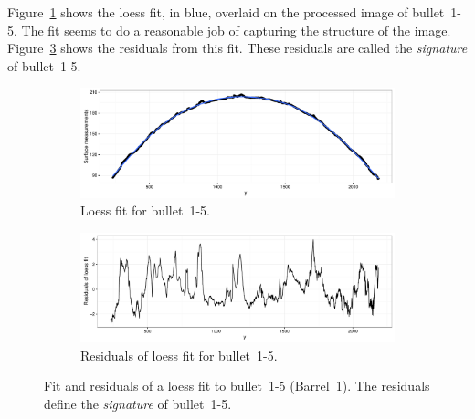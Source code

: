 \documentclass[aoas, preprint]{imsart}\usepackage[]{graphicx}\usepackage[]{color}
\newenvironment{knitrout}{}{} %
\newcommand{\hh}[1]{{\color{magenta} #1}}
\begin{document}

Figure~\ref{fig:loess_fit} shows the loess fit, in blue, overlaid on the processed image of bullet~1-5. The fit seems to do a reasonable job of capturing the structure of the image. %
Figure~\ref{fig:loess_resid} shows the residuals from this fit. These residuals are called the \emph{signature} of bullet~1-5.
%
\begin{figure}[hbtp]
  \centering
\begin{subfigure}[b]{.49\textwidth}\centering
\caption{\label{fig:loess_fit} Loess fit for bullet~1-5.}
\begin{knitrout}
\color{fgcolor}
\includegraphics[width=\textwidth]{loess_fit-1} 

\end{knitrout}
\end{subfigure}
\begin{subfigure}[b]{.49\textwidth}\centering
\caption{\label{fig:loess_resid} Residuals of loess fit for bullet~1-5.
}
\begin{knitrout}
\color{fgcolor}
\includegraphics[width=\textwidth]{boot_loess-1} 

\end{knitrout}
\end{subfigure}
\caption{Fit and residuals of a loess fit to bullet~1-5 (Barrel~1). The residuals define the {\it signature} of bullet~1-5. %
}
\end{figure}
%
\end{document}
